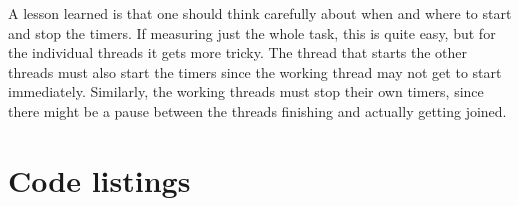 \documentclass[12pt, a4paper]{article} %
\begin{document}
A lesson learned is that one should think carefully about when and where to start and stop the timers.
If measuring just the whole task, this is quite easy, but for the individual threads it gets more tricky.
The thread that starts the other threads must also start the timers since the working thread may not get to start immediately.
Similarly, the working threads must stop their own timers, since there might be a pause between the threads finishing and actually getting joined.

\clearpage
\appendix

\section{Code listings}







%





\end{document}

